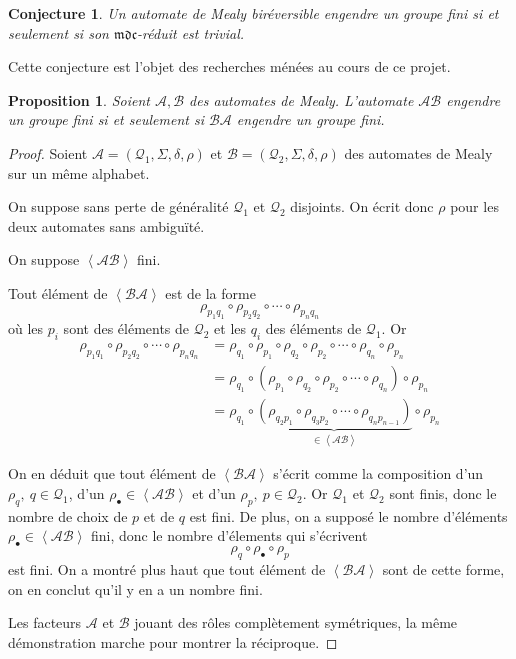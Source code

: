 \documentclass[11pt,a4paper]{article}
\newtheorem{prop}{Proposition}
\newtheorem{conj}{Conjecture}
\begin{document}
\begin{conj}
  \label{conj:birev-mdc}
  Un automate de Mealy biréversible engendre un groupe fini si et seulement si son $\mathfrak{mdc}$-réduit est trivial.
\end{conj}

Cette conjecture est l'objet des recherches ménées au cours de ce projet.

\begin{prop}
  \label{prop:finitude-c}
  Soient $\mathcal{A}, \mathcal{B}$ des automates de Mealy.
  L'automate $\mathcal{A}\mathcal{B}$ engendre un groupe fini si et seulement si $\mathcal{B}\mathcal{A}$ engendre un groupe fini.
\end{prop}

\begin{proof}
  Soient $\mathcal{A}=\left(\mathcal{Q}_1, \Sigma, \delta, \rho\right)$ et $\mathcal{B}=\left(\mathcal{Q}_2, \Sigma, \delta, \rho\right)$ des automates de Mealy sur un même alphabet.

  On suppose sans perte de généralité $\mathcal{Q}_1$ et $\mathcal{Q}_2$ disjoints. On écrit donc $\rho$ pour les deux automates sans ambiguïté.

  On suppose $\left<\mathcal{A}\mathcal{B}\right>$ fini.

  Tout élément de $\left<\mathcal{B}\mathcal{A}\right>$ est de la forme
  \[
    \rho_{p_1q_1}\circ\rho_{p_2q_2}\circ\cdots\circ\rho_{p_nq_n}
  \]
  où les $p_i$ sont des éléments de $\mathcal{Q}_2$ et les $q_i$ des éléments de $\mathcal{Q}_1$. Or
  \begin{align*}
    \rho_{p_1q_1}\circ\rho_{p_2q_2}\circ\cdots\circ\rho_{p_nq_n} &= \rho_{q_1}\circ\rho_{p_1}\circ\rho_{q_2}\circ\rho_{p_2}\circ\cdots\circ\rho_{q_n}\circ\rho_{p_n} \\
    &=\rho_{q_1}\circ\left(\rho_{p_1}\circ\rho_{q_2}\circ\rho_{p_2}\circ\cdots\circ\rho_{q_n}\right)\circ\rho_{p_n} \\
    &=\rho_{q_1}\circ\underbrace{\left(\rho_{q_2p_1}\circ\rho_{q_3p_2}\circ\cdots\circ\rho_{q_np_{n-1}}\right)}_{\in\left<\mathcal{A}\mathcal{B}\right>}\circ\rho_{p_n}
  \end{align*}

  On en déduit que tout élément de $\left<\mathcal{B}\mathcal{A}\right>$ s'écrit comme la composition d'un $\rho_{q},~q\in\mathcal{Q}_1$, d'un $\rho_\bullet\in\left<\mathcal{A}\mathcal{B}\right>$ et d'un $\rho_{p},~p\in\mathcal{Q}_2$. Or $\mathcal{Q}_1$ et $\mathcal{Q}_2$ sont finis, donc le nombre de choix de $p$ et de $q$ est fini. De plus, on a supposé le nombre d'éléments $\rho_\bullet\in\left<\mathcal{A}\mathcal{B}\right>$ fini, donc le nombre d'élements qui s'écrivent \[ \rho_q\circ\rho_\bullet\circ\rho_p \] est fini. On a montré plus haut que tout élément de $\left<\mathcal{B}\mathcal{A}\right>$ sont de cette forme, on en conclut qu'il y en a un nombre fini.

  Les facteurs $\mathcal{A}$ et $\mathcal{B}$ jouant des rôles complètement symétriques, la même démonstration marche pour montrer la réciproque.
\end{proof}
\end{document}
